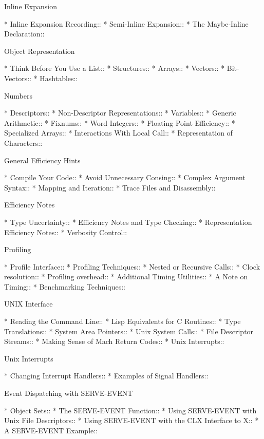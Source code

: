 \begin{menu}
Inline Expansion

* Inline Expansion Recording::  
* Semi-Inline Expansion::       
* The Maybe-Inline Declaration::  

Object Representation

* Think Before You Use a List::  
* Structures::                  
* Arrays::                      
* Vectors::                     
* Bit-Vectors::                 
* Hashtables::                  

Numbers

* Descriptors::                 
* Non-Descriptor Representations::  
* Variables::                   
* Generic Arithmetic::          
* Fixnums::                     
* Word Integers::               
* Floating Point Efficiency::   
* Specialized Arrays::          
* Interactions With Local Call::  
* Representation of Characters::  

General Efficiency Hints

* Compile Your Code::           
* Avoid Unnecessary Consing::   
* Complex Argument Syntax::     
* Mapping and Iteration::       
* Trace Files and Disassembly::  

Efficiency Notes

* Type Uncertainty::            
* Efficiency Notes and Type Checking::  
* Representation Efficiency Notes::  
* Verbosity Control::           

Profiling

* Profile Interface::           
* Profiling Techniques::        
* Nested or Recursive Calls::   
* Clock resolution::            
* Profiling overhead::          
* Additional Timing Utilities::  
* A Note on Timing::            
* Benchmarking Techniques::     

UNIX Interface

* Reading the Command Line::    
* Lisp Equivalents for C Routines::  
* Type Translations::           
* System Area Pointers::        
* Unix System Calls::           
* File Descriptor Streams::     
* Making Sense of Mach Return Codes::  
* Unix Interrupts::             

Unix Interrupts

* Changing Interrupt Handlers::  
* Examples of Signal Handlers::  

Event Dispatching with SERVE-EVENT

* Object Sets::                 
* The SERVE-EVENT Function::    
* Using SERVE-EVENT with Unix File Descriptors::  
* Using SERVE-EVENT with the CLX Interface to X::  
* A SERVE-EVENT Example::       


\end{menu}
